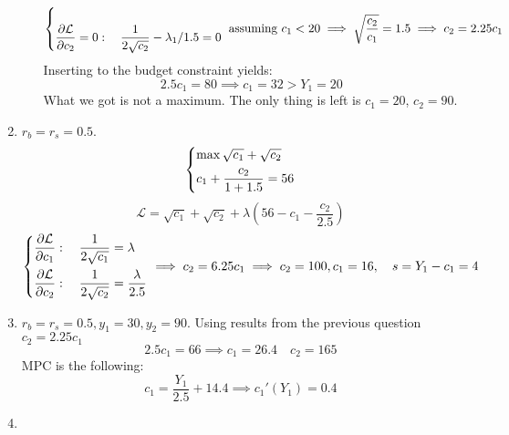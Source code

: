 \documentclass[11pt, oneside]{article}
\begin{document}
\begin{enumerate}[(1)]
\begin{enumerate}[(a)]
\[\begin{dcases}
			\\
			\frac{\partial \mathcal{L}}{\partial c_{2}} = 0: \quad  
			\frac{1}{2\sqrt{c_{2}}} - \lambda_{1} / 1.5 = 0
		\end{dcases}  \text{ assuming } c_{1} < 20 \implies \sqrt{\frac{c_{2}}{c_{1}}} = 1.5 \implies c_{2} = 2.25c_{1}
		\]
		Inserting to the budget constraint yields:
		\[
		2.5c_{1} = 80  \implies c_{1} = 32 > Y_{1} = 20
		\]
		What we got is not a maximum. The only thing is left is $ c_{1} = 20 $, $ c_{2} = 90 $.
	\end{enumerate}
\item $ r_{b} = r_{s} = 0.5 $.
	\[
\begin{dcases}
	\max \sqrt{c_{1}} + \sqrt{c_{2}} \\
	c_{1} + \frac{c_{2}}{1+1.5} = 56
\end{dcases} 
\]
\[
\mathcal{L} = \sqrt{c_{1}} + \sqrt{c_{2}} + \lambda \left( 56 - c_{1} - \frac{c_{2}}{2.5} \right)
\]
\[
	\begin{dcases}
			\frac{\partial \mathcal{L}}{\partial c_{1}}:\quad \frac{1}{2\sqrt{c_{1}}} = \lambda \\
			\frac{\partial \mathcal{L}}{\partial c_{2}}:\quad \frac{1}{2\sqrt{c_{2}}} = \frac{\lambda}{2.5}
	\end{dcases} \implies c_{2} = 6.25 c_{1} \implies c_{2} = 100, c_{1} = 16, \quad s = Y_{1} - c_{1} = 4
\]
\item $ r_{b} = r_{s} = 0.5, y_{1} = 30, y_{2} = 90$.
Using results from the previous question $ c_{2} = 2.25 c_{1} $
\[
2.5c_{1} = 66 \implies c_{1} = 26.4 \quad c_{2} = 165
\]
MPC is the following:
\[
c_{1} = \frac{Y_{1}}{2.5} + 14.4 \implies c_{1}'(Y_{1}) = 0.4
\]
\item 

\end{enumerate}

\clearpage
\end{document}
